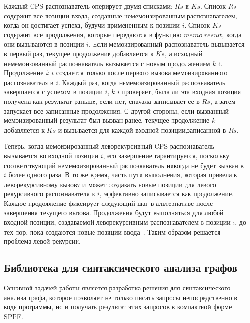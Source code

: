 Каждый CPS-распознаватель оперирует двумя списками: $Rs$ и $Ks$. Список $Rs$ содержит все позиции входа, созданные немемоизированным распознавателем, когда он достигает успеха, будучи примененным к позиции $i$. Список $Ks$ содержит все продолжения, которые передаются в функцию $memo\_result$, когда они вызываются в позиции $i$. Если мемоизированный распознаватель вызывается в первый раз, текущее продолжение добавляется к $Ks$, а исходный немемоизованный распознаватель вызывается с новым продолжением $k\_i$. Продолжение $k\_i$ создается только после первого вызова мемоизированного распознавателя в $i$. Каждый раз, когда немемоизированный распознаватель завершается с успехом в позиции $i$, $k\_i$ проверяет, была ли эта входная позиция получена как результат раньше, если нет, сначала записывает ее в $Rs$, а затем запускает все записанные продолжения. С другой стороны, если вызванный мемоизированный результат был вызван ранее, текущее продолжение $k$ добавляется к $Ks$ и вызывается для каждой входной позиции,записанной в $Rs$.

Теперь, когда мемоизированный леворекурсивный CPS-распознаватель вызывается во входной позиции $i$, его завершение гарантируется, поскольку соответствующий немемоизированный распознаватель никогда не будет вызван в $i$ более одного раза. В то же время, часть пути выполнения, которая привела к леворекурсивному вызову и может создавать новые позиции для левого рекурсивного распознавателя в $i$, эффективно записывается как продолжение. Каждое продолжение фиксирует следующий шаг в альтернативе после завершения текущего вызова. Продолжения будут выполняться для любой входной позиции, создаваемой леворекурсивным распознавателем в позиции $i$, до тех пор, пока создаются новые позиции ввода~\cite{IzmCombinator}. Таким образом решается проблема левой рекурсии.

\subsection{ Библиотека для синтаксического анализа графов}
Основной задачей работы является разработка решения для синтаксического анализа графа, которое позволяет не только писать запросы непосредственно в коде программы, но и получать результат этих запросов в компактной форме SPPF.

